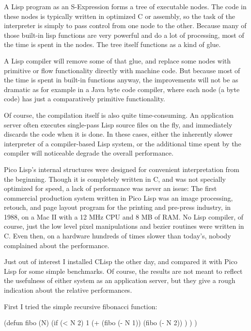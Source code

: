 A Lisp program as an S-Expression forms a tree of executable nodes. The code in
these nodes is typically written in optimized C or assembly, so the task of the
interpreter is simply to pass control from one node to the other. Because many
of those built-in lisp functions are very powerful and do a lot of processing,
most of the time is spent in the nodes. The tree itself functions as a kind of
glue.

A Lisp compiler will remove some of that glue, and replace some nodes with
primitive or flow functionality directly with machine code. But because most of
the time is spent in built-in functions anyway, the improvements will not be as
dramatic as for example in a Java byte code compiler, where each node (a byte
code) has just a comparatively primitive functionality.

Of course, the compilation itself is also quite time-consuming. An application
server often executes single-pass Lisp source files on the fly, and immediately
discards the code when it is done. In these cases, either the inherently slower
interpreter of a compiler-based Lisp system, or the additional time spent by the
compiler will noticeable degrade the overall performance.

Pico Lisp's internal structures were designed for convenient interpretation from
the beginning. Though it is completely written in C, and was not specially
optimized for speed, a lack of performance was never an issue: The first
commercial production system written in Pico Lisp was an image processing,
retouch, and page layout program for the printing and pre-press industry, in
1988, on a Mac II with a 12 MHz CPU and 8 MB of RAM. No Lisp compiler, of
course, just the low level pixel manipulations and bezier routines were written
in C. Even then, on a hardware hundreds of times slower than today's, nobody
complained about the performance.

Just out of interest I installed CLisp the other day, and compared it with Pico
Lisp for some simple benchmarks. Of course, the results are not meant to reflect
the usefulness of either system as an application server, but they give a rough
indication about the relative performances.

First I tried the simple recursive fibonacci function:

\begin{wideverbatim}
   (defun fibo (N)
      (if (< N 2)
         1
         (+
            (fibo (- N 1))
            (fibo (- N 2)) ) ) )
\end{wideverbatim}

